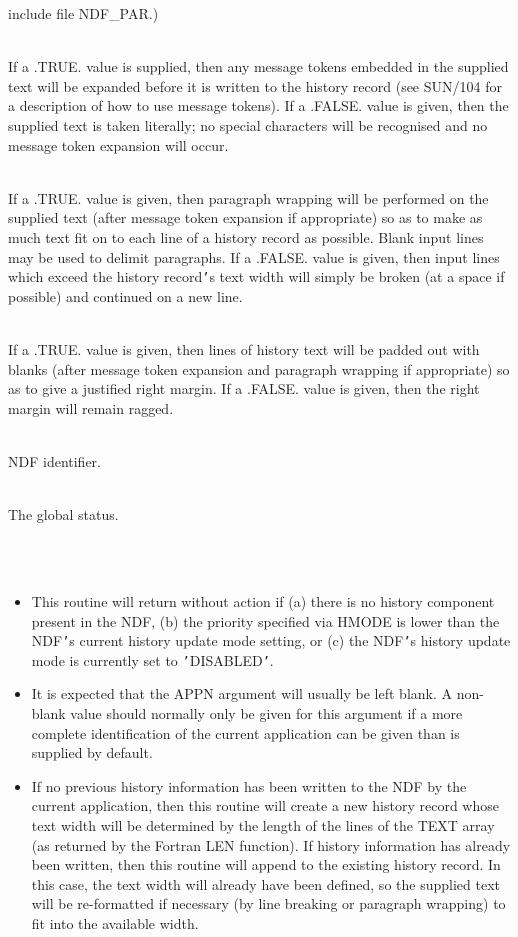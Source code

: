 \documentclass[twoside,11pt]{article}
\newcommand{\xref}[3]{#1}
\newcommand{\hi}[1]{{\tt{#1}}}
\newcommand{\sstsubsection}[1]{ \item[{#1}] \mbox{} \\}
\newcommand{\sstnotes}[1]{\item[Notes:] \mbox{} \\[1.3ex] #1}
\newcommand{\sstitemlist}[1]{
  \mbox{} \\
  \vspace{-3.5ex}
  \begin{itemize}
     #1
  \end{itemize}
}
\newcommand{\sstitem}{\item}
\newcommand{\sstsubsection}[1]{\item[{#1}]}
\newcommand{\sstnotes}[1]{\item[Notes:] #1 }
\newcommand{\sstitemlist}[1]{
      \begin{itemize}
         #1
      \end{itemize}
      \\
   }
\newcommand{\sstitem}{\item}
\begin{document}
{{{         include file NDF\_PAR.)
      }
      \sstsubsection{
         TRANS = LOGICAL (Given)
      }{
         If a .TRUE. value is supplied, then any message tokens
         embedded in the supplied text will be expanded before it is
         written to the history record (see
         \xref{SUN/104}{sun104}{msg} for a description
         of how to use message tokens). If a .FALSE. value is given,
         then the supplied text is taken literally; no special
         characters will be recognised and no message token expansion
         will occur.
      }
      \sstsubsection{
         WRAP = LOGICAL (Given)
      }{
         If a .TRUE. value is given, then paragraph wrapping will be
         performed on the supplied text (after message token expansion
         if appropriate) so as to make as much text fit on to each line
         of a history record as possible. Blank input lines may be used
         to delimit paragraphs. If a .FALSE. value is given, then input
         lines which exceed the history record\hi{'}s text width will simply
         be broken (at a space if possible) and continued on a new
         line.
      }
      \sstsubsection{
         RJUST = LOGICAL (Given)
      }{
         If a .TRUE. value is given, then lines of history text will be
         padded out with blanks (after message token expansion and
         paragraph wrapping if appropriate) so as to give a justified
         right margin. If a .FALSE. value is given, then the right
         margin will remain ragged.
      }
      \sstsubsection{
         INDF = INTEGER (Given)
      }{
         NDF identifier.
      }
      \sstsubsection{
         STATUS = INTEGER (Given and Returned)
      }{
         The global status.
      }
   }
   \sstnotes{
      \sstitemlist{

         \sstitem
         This routine will return without action if (a) there is no
         history component present in the NDF, (b) the priority specified
         via HMODE is lower than the NDF\hi{'}s current history update mode
         setting, or (c) the NDF\hi{'}s history update mode is currently set to
         \hi{'}DISABLED\hi{'}.

         \sstitem
         It is expected that the APPN argument will usually be left
         blank. A non-blank value should normally only be given for this
         argument if a more complete identification of the current
         application can be given than is supplied by default.

         \sstitem
         If no previous history information has been written to the NDF
         by the current application, then this routine will create a new
         history record whose text width will be determined by the length
         of the lines of the TEXT array (as returned by the Fortran LEN
         function). If history information has already been written, then
         this routine will append to the existing history record. In this
         case, the text width will already have been defined, so the
         supplied text will be re-formatted if necessary (by line breaking
         or paragraph wrapping) to fit into the available width.

}}}
\end{document}
